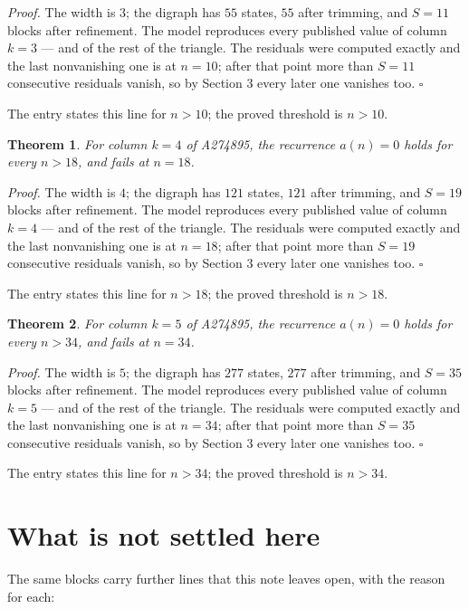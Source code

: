 \documentclass[11pt]{article}
\newtheorem{theorem}{Theorem}
\theoremstyle{definition}
\begin{document}
{\itshape Proof.} The width is $3$; the digraph has $55$ states, $55$ after trimming, and $S = 11$ blocks after refinement. The model reproduces every published value of column $k = 3$ --- and of the rest of the triangle. The residuals were computed exactly and the last nonvanishing one is at $n = 10$; after that point more than $S = 11$ consecutive residuals vanish, so by Section 3 every later one vanishes too. $\square$

The entry states this line for $n > 10$; the proved threshold is $n > 10$.

\begin{theorem} For column $k = 4$ of A274895, the recurrence $a(n) = 0$ holds for every $n > 18$, and fails at $n = 18$.\end{theorem}

{\itshape Proof.} The width is $4$; the digraph has $121$ states, $121$ after trimming, and $S = 19$ blocks after refinement. The model reproduces every published value of column $k = 4$ --- and of the rest of the triangle. The residuals were computed exactly and the last nonvanishing one is at $n = 18$; after that point more than $S = 19$ consecutive residuals vanish, so by Section 3 every later one vanishes too. $\square$

The entry states this line for $n > 18$; the proved threshold is $n > 18$.

\begin{theorem} For column $k = 5$ of A274895, the recurrence $a(n) = 0$ holds for every $n > 34$, and fails at $n = 34$.\end{theorem}

{\itshape Proof.} The width is $5$; the digraph has $277$ states, $277$ after trimming, and $S = 35$ blocks after refinement. The model reproduces every published value of column $k = 5$ --- and of the rest of the triangle. The residuals were computed exactly and the last nonvanishing one is at $n = 34$; after that point more than $S = 35$ consecutive residuals vanish, so by Section 3 every later one vanishes too. $\square$

The entry states this line for $n > 34$; the proved threshold is $n > 34$.

\section{What is not settled here}

The same blocks carry further lines that this note leaves open, with the reason for each:
\end{document}
